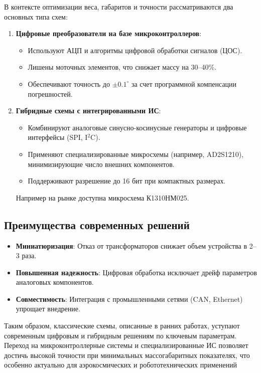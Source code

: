 В контексте оптимизации веса, габаритов и точности рассматриваются два основных типа схем:

\begin{enumerate}
    \item \textbf{Цифровые преобразователи на базе микроконтроллеров}:
    \begin{itemize}
        \item Используют АЦП и алгоритмы цифровой обработки сигналов (ЦОС).
        \item Лишены моточных элементов, что снижает массу на 30–40\%.
        \item Обеспечивают точность до \(\pm0.1^\circ\) за счет программной компенсации погрешностей.
    \end{itemize}
    
    \item \textbf{Гибридные схемы с интегрированными ИС}: 
    \begin{itemize}
        \item Комбинируют аналоговые синусно-косинусные генераторы и цифровые интерфейсы (SPI, I\(^2\)C).
        \item Применяют специализированные микросхемы (например, AD2S1210), минимизирующие число внешних компонентов.
        \item Поддерживают разрешение до 16 бит при компактных размерах.
    \end{itemize}
    Например на рынке доступна микросхема К1310НМ025. \cite{Spec}
\end{enumerate}

\subsection{Преимущества современных решений}
\begin{itemize}
    \item \textbf{Миниатюризация}: Отказ от трансформаторов снижает объем устройства в 2–3 раза.
    \item \textbf{Повышенная надежность}: Цифровая обработка исключает дрейф параметров аналоговых компонентов.
    \item \textbf{Совместимость}: Интеграция с промышленными сетями (CAN, Ethernet) упрощает внедрение.
\end{itemize}

Таким образом, классические схемы, описанные в ранних работах, уступают современным цифровым и гибридным решениям по ключевым параметрам. 
Переход на микроконтроллерные системы и специализированные ИС позволяет достичь высокой точности при минимальных массогабаритных показателях, 
что особенно актуально для аэрокосмических и робототехнических применений

